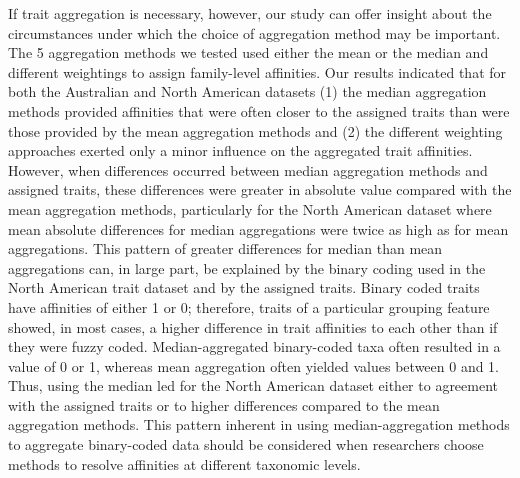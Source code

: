\documentclass{article}
\begin{document}
If trait aggregation is necessary, however, our study can offer insight about the circumstances under which the choice of aggregation method may be important. The 5 aggregation methods we tested used either the mean or the median and different weightings to assign family-level affinities. Our results indicated that for both the Australian and North American datasets (1) the median aggregation methods provided affinities that were often closer to the assigned traits than were those provided by the mean aggregation methods and (2) the different weighting approaches exerted only a minor influence on the aggregated trait affinities. However, when differences occurred between median aggregation methods and assigned traits, these differences were greater in absolute value compared with the mean aggregation methods, particularly for the North American dataset where mean absolute differences for median aggregations were twice as high as for mean aggregations. This pattern of greater differences for median than mean aggregations can, in large part, be explained by the binary coding used in the North American trait dataset and by the assigned traits. Binary coded traits have affinities of either 1 or 0; therefore, traits of a particular grouping feature showed, in most cases, a higher difference in trait affinities to each other than if they were fuzzy coded. Median-aggregated binary-coded taxa often resulted in a value of 0 or 1, whereas mean aggregation often yielded values between 0 and 1. Thus, using the median led for the North American dataset either to agreement with the assigned traits or to higher differences compared to the mean aggregation methods. This pattern inherent in using median-aggregation methods to aggregate binary-coded data should be considered when researchers choose methods to resolve affinities at different taxonomic levels. 
\end{document}
